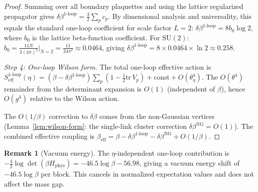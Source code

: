 \documentclass[11pt]{article}
\theoremstyle{definition}
\newtheorem{remark}[theorem]{Remark}
\newcommand{\SU}{\mathrm{SU}}
\newcommand{\tr}{\mathrm{tr}}
\begin{document}
\begin{proof}
Summing over all boundary plaquettes and using the lattice
regularized propagator gives
$\delta\beta^{1\text{-loop}}
=\frac{3}{2}\sum_p c_p$.
By dimensional analysis and universality, this equals the
standard one-loop coefficient for scale factor $L=2$:
$\delta\beta^{1\text{-loop}}=8b_0\log 2$, where $b_0$ is
the lattice beta-function coefficient.
For $\SU(2)$: $b_0=\frac{11N}{3(4\pi)^2}\big|_{N=2}
=\frac{11}{24\pi^2}\approx 0.0464$, giving
$\delta\beta^{1\text{-loop}}=8\times 0.0464\times\ln 2
\approx 0.258$.

\emph{Step 4: One-loop Wilson form.}
The total one-loop effective action is
$S_{\mathrm{eff}}^{1\text{-loop}}(\eta)
=(\beta-\delta\beta^{1\text{-loop}})\sum_p
(1-\frac{1}{2}\tr\,V_p)+\mathrm{const}+O(\theta_\eta^4)$.
The $O(\theta^4)$ remainder from the determinant expansion
is $O(1)$ (independent of $\beta$), hence $O(g^4)$ relative
to the Wilson action.

The $O(1/\beta)$ correction to $\delta\beta$ comes from the
non-Gaussian vertices (Lemma~\ref{lem:wilson-form}:
the single-link cluster correction $\delta\beta^{\mathrm{NG}}
=O(1)$).  The combined effective coupling is
$\beta_{\mathrm{eff}}
=\beta-\delta\beta^{1\text{-loop}}-\delta\beta^{\mathrm{NG}}
+O(1/\beta)$.
\end{proof}

\begin{remark}[Vacuum energy]
The $\eta$-independent one-loop contribution is
$-\frac{3}{2}\log\det(\beta H_{\mathrm{phys}})
=-46.5\log\beta-56.98$, giving a vacuum energy shift of
$-46.5\log\beta$ per block.  This cancels in normalized expectation
values and does not affect the mass gap.
\end{remark}
\end{document}
